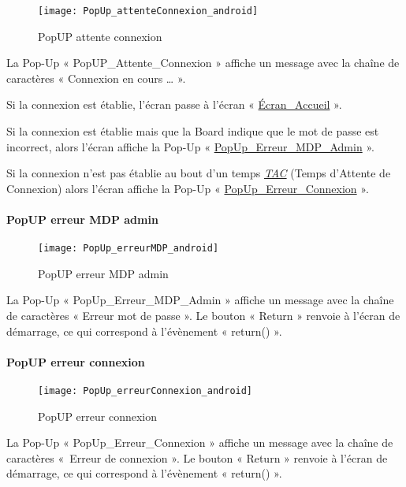 \begin{figure} [H]
    \centering
    \texttt{[image: PopUp\_attenteConnexion\_android]}
    \caption{PopUP attente connexion}
    \label{PopUP attente connexion}
\end{figure}

La Pop-Up « PopUP\_Attente\_Connexion » affiche un message avec la chaîne de caractères « Connexion en cours … ».

Si la connexion est établie, l’écran passe à l’écran « \hyperlink{EcranAccueil}{Écran\_Accueil} ».

Si la connexion est établie mais que la Board indique que le mot de passe est incorrect, alors l'écran affiche la Pop-Up « \hyperlink{popUpErreurMDPAdmin}{PopUp\_Erreur\_MDP\_Admin} ».

Si la connexion n'est pas établie au bout d’un temps \hyperlink{tac}{\textit{TAC}} (Temps d’Attente de Connexion) alors l’écran affiche la Pop-Up « \hyperlink{popUpErreurConnexion}{PopUp\_Erreur\_Connexion} ».

\paragraph{PopUP erreur MDP admin}
\hypertarget{popUpErreurMDPAdmin}{}

\begin{figure} [H]
    \centering
    \texttt{[image: PopUp\_erreurMDP\_android]}
    \caption{PopUP erreur MDP admin}
    \label{PopUP erreur MDP admin}
\end{figure}

La Pop-Up « PopUp\_Erreur\_MDP\_Admin » affiche un message avec la chaîne de caractères « Erreur mot de passe ». 
Le bouton « Return » renvoie à l’écran de démarrage, ce qui correspond à l'évènement « return() ».

\paragraph{PopUP erreur connexion}
\hypertarget{popUpErreurConnexion}{}

\begin{figure} [H]
    \centering
    \texttt{[image: PopUp\_erreurConnexion\_android]}
    \caption{PopUP erreur connexion}
    \label{PopUP erreur connexion}
\end{figure}

La Pop-Up « PopUp\_Erreur\_Connexion » affiche un message avec la chaîne de caractères «~Erreur de connexion ».
Le bouton « Return » renvoie à l’écran de démarrage, ce qui correspond à l'évènement « return() ».

